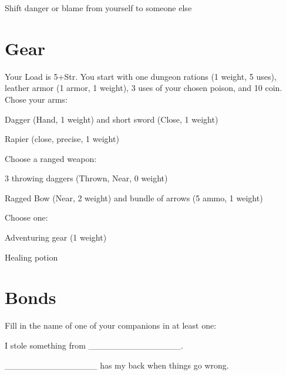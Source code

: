Shift danger or blame from yourself to someone else



 
\section{Gear}   
 



Your Load is 5+Str. You start with one dungeon rations (1 weight, 5 uses), leather armor (1 armor, 1 weight), 3 uses of your chosen poison, and 10 coin. Chose your arms:

 
\startitemize[1,packed]

\item Dagger (Hand, 1 weight) and short sword (Close, 1 weight)

 
\item Rapier (close, precise, 1 weight)


\stopitemize
 

Choose a ranged weapon:

 
\startitemize[1,packed]

\item 3 throwing daggers  (Thrown, Near, 0 weight)

 
\item Ragged Bow (Near, 2 weight) and bundle of arrows (5 ammo, 1 weight)


\stopitemize
 

Choose one:

 
\startitemize[1,packed]

\item Adventuring gear (1 weight)

 
\item Healing potion


\stopitemize


 
\section{Bonds}   
 



Fill in the name of one of your companions in at least one:

 

I stole something from \_\_\_\_\_\_\_\_\_\_\_\_\_\_\_.

 

\_\_\_\_\_\_\_\_\_\_\_\_\_\_\_ has my back when things go wrong.

